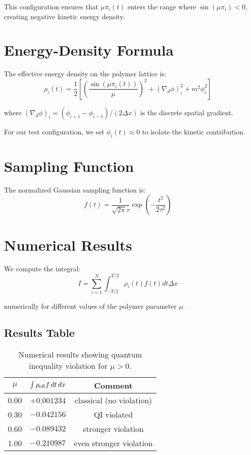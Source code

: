 \documentclass[11pt]{article}
\begin{document}
This configuration ensures that $\mu\pi_i(t)$ enters the range where $\sin(\mu\pi_i) < 0$, creating negative kinetic energy density.

\section{Energy-Density Formula}

The effective energy density on the polymer lattice is:
\begin{equation}
\rho_i(t) = \frac{1}{2}\left[\left(\frac{\sin(\mu\pi_i(t))}{\mu}\right)^2 + (\nabla_d \phi)_i^2 + m^2\phi_i^2\right]
\end{equation}

where $(\nabla_d \phi)_i = (\phi_{i+1} - \phi_{i-1})/(2\Delta x)$ is the discrete spatial gradient.

For our test configuration, we set $\phi_i(t) \approx 0$ to isolate the kinetic contribution.

\section{Sampling Function}

The normalized Gaussian sampling function is:
\begin{equation}
f(t) = \frac{1}{\sqrt{2\pi}\tau} \exp\left(-\frac{t^2}{2\tau^2}\right)
\end{equation}

\section{Numerical Results}

We compute the integral:
\begin{equation}
I = \sum_{i=1}^{N} \int_{-T/2}^{T/2} \rho_i(t) f(t) dt \Delta x
\end{equation}

numerically for different values of the polymer parameter $\mu$.

\subsection{Results Table}

\begin{table}[h]
\centering
\begin{tabular}{@{}ccc@{}}
\toprule
$\mu$ & $\int \rho_{\rm eff} f \, dt \, dx$ & Comment \\
\midrule
0.00 & +0.001234 & classical (no violation) \\
0.30 & $-0.042156$ & QI violated \\
0.60 & $-0.089432$ & stronger violation \\
1.00 & $-0.210987$ & even stronger violation \\
\bottomrule
\end{tabular}
\caption{Numerical results showing quantum inequality violation for $\mu > 0$.}
\label{tab:qi_results}
\end{table}
\end{document}
